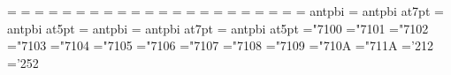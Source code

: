 %
=\teni
{}=\seveni
{}=\fivei
\def\mit{\fam=1}%
%
=\tensy
{}=\sevensy
{}=\fivesy
\def\cal{\fam=2}%
%
=\tenex
{}=\sevenex
{}=\fiveex
%
\def\it{\fam=\itfam \tenit}%
\textfont\itfam=\tenit
\scriptfont\itfam=\sevenit
\scriptscriptfont\itfam=\fiveit
%
\def\sl{\fam=\slfam \tensl}%
\textfont\slfam=\tensl
\scriptfont\slfam=\sevensl
\scriptscriptfont\slfam=\fivesl
%
\def\bf{\fam=\bffam \tenbf}%
\textfont\bffam=\tenbf
\scriptfont\bffam=\sevenbf
\scriptscriptfont\bffam=\fivebf
%
\def\tt{\fam=\ttfam \tentt}%
\textfont\ttfam=\tentt
\scriptfont\ttfam=\seventt
\scriptscriptfont\ttfam=\fivett
%
\def\twentyitbf{\font\fzzozznzzt=   antpbi at20pt \fzzozznzzt}%
\def\eighteenitbf{\font\fzzozznzzt= antpbi at18pt \fzzozznzzt}%
\def\sixteenitbf{\font\fzzozznzzt=  antpbi at16pt \fzzozznzzt}%
\def\fourteenitbf{\font\fzzozznzzt=    antpbi at14pt \fzzozznzzt}%
\def\twelveitbf{\font\fzzozznzzt=   antpbi at12pt \fzzozznzzt}%
\font\itbf=            antpbi
\def\nineitbf{\font\fzzozznzzt=        antpbi at9pt \fzzozznzzt}%
\def\eightitbf{\font\fzzozznzzt=       antpbi at8pt \fzzozznzzt}%
\font\sevenitbf=       antpbi at7pt
\def\sixitbf{\font\fzzozznzzt=         antpbi at6pt \fzzozznzzt}%
\font\fiveitbf=        antpbi at5pt
%
\def\twentyslbf{\font\fzzozznzzt=   antpbi at20pt \fzzozznzzt}%
\def\eighteenslbf{\font\fzzozznzzt= antpbi at18pt \fzzozznzzt}%
\def\sixteenslbf{\font\fzzozznzzt=  antpbi at16pt \fzzozznzzt}%
\def\fourteenslbf{\font\fzzozznzzt=    antpbi at14pt \fzzozznzzt}%
\def\twelveslbf{\font\fzzozznzzt=   antpbi at12pt \fzzozznzzt}%
\font\slbf=            antpbi
\def\nineslbf{\font\fzzozznzzt=        antpbi at9pt \fzzozznzzt}%
\def\eightslbf{\font\fzzozznzzt=       antpbi at8pt \fzzozznzzt}%
\font\sevenslbf=       antpbi at7pt
\def\sixslbf{\font\fzzozznzzt=         antpbi at6pt \fzzozznzzt}%
\font\fiveslbf=        antpbi at5pt
%
\mathchardef\Gamma="7100
\mathchardef\Delta="7101
\mathchardef\Theta="7102
\mathchardef\Lambda="7103
\mathchardef\Xi="7104
\mathchardef\Pi="7105
\mathchardef\Sigma="7106
\mathchardef\Upsilon="7107
\mathchardef\Phi="7108
\mathchardef\Psi="7109
\mathchardef\Omega="710A
\mathchardef\varrho="711A
%
\chardef\Lstroke='212%
\chardef\lstroke='252%
%
\rm